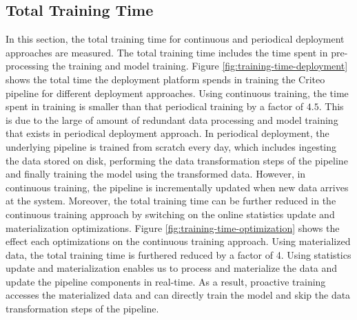 \subsection{Total Training Time}
In this section, the total training time for continuous and periodical deployment approaches are measured.
The total training time includes the time spent in pre-processing the training and model training.
Figure \ref{fig:training-time-deployment} shows the total time the deployment platform spends in training the Criteo pipeline for different deployment approaches.
Using continuous training, the time spent in training is smaller than that periodical training by a factor of $4.5$.
This is due to the large of amount of redundant data processing and model training that exists in periodical deployment approach.
In periodical deployment, the underlying pipeline is trained from scratch every day, which includes ingesting the data stored on disk, performing the data transformation steps of the pipeline and finally training the model using the transformed data.
However, in continuous training, the pipeline is incrementally updated when new data arrives at the system.
Moreover, the total training time can be further reduced in the continuous training approach by switching on the online statistics update and materialization optimizations.
Figure \ref{fig:training-time-optimization} shows the effect each optimizations on the continuous training approach.
Using materialized data, the total training time is furthered reduced by a factor of 4.
Using statistics update and materialization enables us to process and materialize the data and update the pipeline components in real-time.
As a result, proactive training accesses the materialized data and can directly train the model and skip the data transformation steps of the pipeline.

